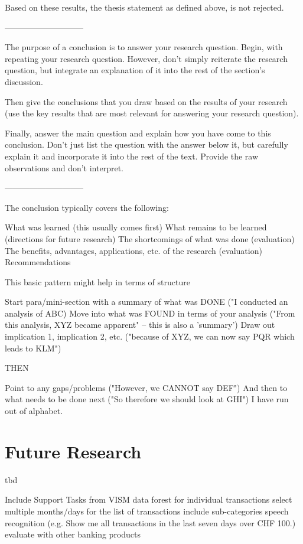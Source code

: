 Based on these results, the thesis statement as defined above, is not rejected.




-----------------------------

The purpose of a conclusion is to answer your research question. Begin, with repeating your research question. However, don’t simply reiterate the research question, but integrate an explanation of it into the rest of the section’s discussion.

Then give the conclusions that you draw based on the results of your research (use the key results that are most relevant for answering your research question).

Finally, answer the main question and explain how you have come to this conclusion. Don’t just list the question with the answer below it, but carefully explain it and incorporate it into the rest of the text. Provide the raw observations and don’t interpret.

-----------------------------


The conclusion typically covers the following:

What was learned (this usually comes first)
What remains to be learned (directions for future research)
The shortcomings of what was done (evaluation)
The benefits, advantages, applications, etc. of the research (evaluation)
Recommendations


This basic pattern might help in terms of structure

Start para/mini-section with a summary of what was DONE ("I conducted an analysis of ABC)
Move into what was FOUND in terms of your analysis ("From this analysis, XYZ became apparent" -- this is also a 'summary')
Draw out implication 1, implication 2, etc. ("because of XYZ, we can now say PQR which leads to KLM")

THEN

Point to any gaps/problems ("However, we CANNOT say DEF")
And then to what needs to be done next ("So therefore we should look at GHI")
I have run out of alphabet.





\section{Future Research}

tbd


Include Support Tasks from VISM \newline
data forest for individual transactions \newline
select multiple months/days for the list of transactions \newline
include sub-categories \newline
speech recognition (e.g. Show me all transactions in the last seven days over CHF 100.) \newline
evaluate with other banking products  \newline